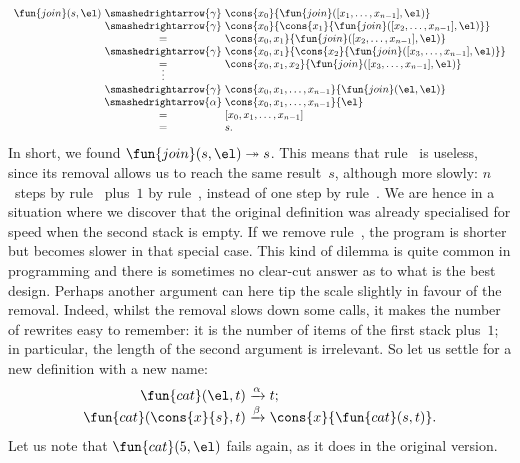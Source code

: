 \begin{equation*}
\begin{array}{r@{\;}c@{\;}l}
\fun{join}(s,\el)
& \smashedrightarrow{\gamma} &
  \cons{x\sb{0}}{\fun{join}([x\sb{1},\ldots,x\sb{n-1}],\el)}\\
& \smashedrightarrow{\gamma} &
  \cons{x\sb{0}}{\cons{x\sb{1}}{\fun{join}([x\sb{2},\ldots,x\sb{n-1}],\el)}}\\
  & = &
  \cons{x\sb{0},x\sb{1}}{\fun{join}([x\sb{2},\ldots,x\sb{n-1}],\el)}\\
& \smashedrightarrow{\gamma} &
  \cons{x\sb{0},x\sb{1}}{\cons{x\sb{2}}{\fun{join}([x\sb{3},\ldots,x\sb{n-1}],\el)}}\\
  & = &
  \cons{x\sb{0},x\sb{1},x\sb{2}}{\fun{join}([x\sb{3},\ldots,x\sb{n-1}],\el)}\\
& \smash{\vdots} &\\
& \smashedrightarrow{\gamma} &
  \cons{x\sb{0},x\sb{1},\ldots,x\sb{n-1}}{\fun{join}(\el,\el)}\\
& \smashedrightarrow{\alpha} & \cons{x\sb{0},x\sb{1},\ldots,x\sb{n-1}}{\el}\\
  & = &
  [x\sb{0},x\sb{1},\ldots,x\sb{n-1}]\\
& = & s.
\end{array}
\end{equation*}
In short, we found \(\fun{join}(s,\el) \twoheadrightarrow s\).
This means that rule~\clause{\beta} is useless, since its removal
allows us to reach the same result~\(s\), although more slowly:
\(n\)~steps by rule~\clause{\gamma} plus~\(1\) by
rule~\clause{\alpha}, instead of one step by
rule~\clause{\beta}. We are hence in a situation where we discover
that the original definition was already specialised for speed when
the second stack is empty. If we remove rule~\clause{\beta}, the
program is shorter but becomes slower in that special case. This kind
of dilemma is quite common in programming and there is sometimes no
clear\hyp{}cut answer as to what is the best design. Perhaps another
argument can here tip the scale slightly in favour of the
removal. Indeed, whilst the removal slows down some calls, it makes
the number of rewrites easy to remember: it is the number of items of
the first stack plus~\(1\); in particular, the length of the second
argument is irrelevant. So let us settle for a new definition with a
new name:
\begin{equation*}
\begin{array}{r@{\;}l@{\;}l}
\fun{cat}(\el,t) & \xrightarrow{\alpha} & t;\\
\fun{cat}(\cons{x}{s},t) & \xrightarrow{\beta} &
\cons{x}{\fun{cat}(s,t)}.
\end{array}
\end{equation*}
Let us note that \(\fun{cat}(5,\el)\) fails again, as it does in the
original version.

